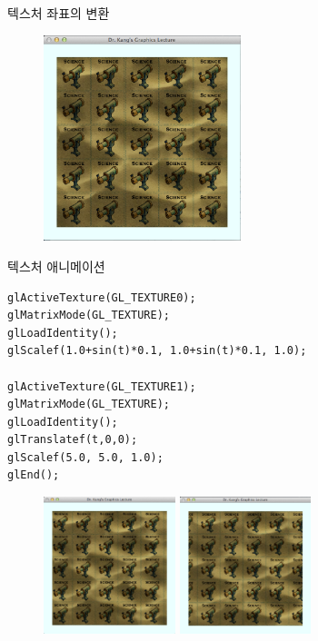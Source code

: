 \documentclass{beamer}
\begin{document}
\begin{frame}[fragile]{텍스처 좌표의 변환}

\begin{figure}[h!]
    \centering
	\includegraphics[height=6cm]{OGL_texture/multiTexturedForAni.png} 
\end{figure}

\end{frame}


\begin{frame}[fragile]{텍스처 애니메이션}

\lstset{language=C++} 
\begin{lstlisting}
glActiveTexture(GL_TEXTURE0);
glMatrixMode(GL_TEXTURE);
glLoadIdentity();
glScalef(1.0+sin(t)*0.1, 1.0+sin(t)*0.1, 1.0);
	
glActiveTexture(GL_TEXTURE1);
glMatrixMode(GL_TEXTURE);
glLoadIdentity();
glTranslatef(t,0,0);
glScalef(5.0, 5.0, 1.0);
glEnd();
\end{lstlisting}

\begin{figure}[h!]
    \centering
	\includegraphics[height=4cm]{OGL_texture/multiTexAni_A.png} 
	\includegraphics[height=4cm]{OGL_texture/multiTexAni_B.png} 
\end{figure}

\end{frame}
\end{document}
